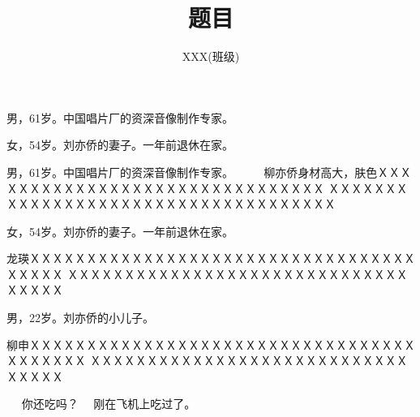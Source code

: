 \title{题目}

\author{XXX(班级)}



男，61岁。中国唱片厂的资深音像制作专家。

女，54岁。刘亦侨的妻子。一年前退休在家。

男，61岁。中国唱片厂的资深音像制作专家。
　　
柳亦侨身材高大，肤色ＸＸＸＸＸＸＸＸＸＸＸＸＸＸＸＸＸＸＸＸＸＸＸＸＸＸＸＸＸＸＸ
ＸＸＸＸＸＸＸＸＸＸＸＸＸＸＸＸＸＸＸＸＸＸＸＸＸＸＸＸＸＸＸＸＸＸＸＸ

女，54岁。刘亦侨的妻子。一年前退休在家。

龙瑛ＸＸＸＸＸＸＸＸＸＸＸＸＸＸＸＸＸＸＸＸＸＸＸＸＸＸＸＸＸＸＸＸＸＸＸＸＸＸＸ
ＸＸＸＸＸＸＸＸＸＸＸＸＸＸＸＸＸＸＸＸＸＸＸＸＸＸＸＸＸＸＸＸＸＸＸ

男，22岁。刘亦侨的小儿子。

柳申ＸＸＸＸＸＸＸＸＸＸＸＸＸＸＸＸＸＸＸＸＸＸＸＸＸＸＸＸＸＸＸＸＸＸＸＸＸＸＸＸＸ
ＸＸＸＸＸＸＸＸＸＸＸＸＸＸＸＸＸＸＸＸＸＸＸＸＸＸＸＸＸＸＸＸＸ

\act

 　 你还吃吗？
　刚在飞机上吃过了。
